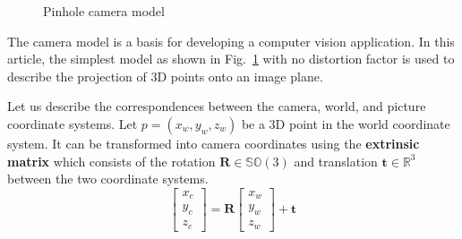\documentclass[graybox]{svmult}
\begin{document}
\begin{figure}
\caption{Pinhole camera model}
\label{fig:camera}
\end{figure}


The camera model is a basis for developing a computer vision application. In this article,
the simplest model as shown in Fig.~\ref{fig:camera} with no distortion factor is used to describe the projection of 3D points onto an image plane. %

Let us describe the correspondences between the camera, world, and picture coordinate systems.
Let $p = (x_w, y_w, z_w)$ be a 3D point in the world coordinate system.
It can be transformed into camera coordinates using the \textbf{extrinsic matrix} which consists of the rotation $\textbf{R} \in \mathbb{SO}(3)$  and translation $\textbf{t} \in \mathbb{R}^3$ between the two coordinate systems.
    $$
     \begin{bmatrix}
	 x_c\\y_c\\z_c		
	 \end{bmatrix}
	 =
	 \textbf{R}
	 \begin{bmatrix}
	 x_w\\y_w\\z_w		
	 \end{bmatrix}
	 + \textbf{t}
	 \label{eq:wc}
$$
\end{document}

